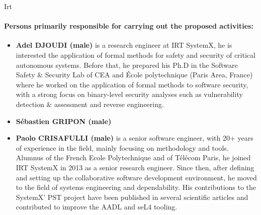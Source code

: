 \begin{sitedescription}{Irt}
\paragraph{Persons primarily responsible for carrying out the proposed activities:}

\begin{itemize} %

\item{\bf Adel DJOUDI (male)} is a research engineer at IRT SystemX, he is interested the application of formal methods for safety and security of critical autonomous systems. Before that, he prepared his Ph.D in the Software Safety \& Security Lab of CEA and École polytechnique (Paris Area, France) where he worked on the application of formal methods to software security, with a strong focus on binary-level security analyses such as vulnerability detection \& assessment and reverse engineering.
\item{\bf Sébastien GRIPON (male)}
\item{\bf Paolo CRISAFULLI (male)} is a senior software engineer, with 20+ years of experience in the field, mainly focusing on methodology and tools. Alumnus of the French Ecole Polytechnique and of Télécom Paris, he joined IRT SystemX in 2013 as a senior research engineer. Since then, after defining and setting up the collaborative software development environment, he moved to the field of systems engineering and dependability. His contributions to the SystemX’ PST project have been published in several scientific articles and contributed to improve the AADL and seL4 tooling.

\end{itemize}

\end{sitedescription}

